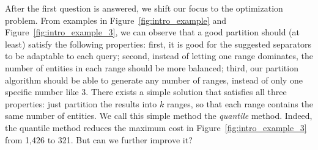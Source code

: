 

After the first question is answered, we shift our focus to the optimization problem. From examples in Figure~\ref{fig:intro_example} and Figure~\ref{fig:intro_example_3}, we can observe that a good partition should (at least) satisfy the following properties: first, it is good for the suggested separators to be adaptable to each query; second, instead of letting one range dominates, the number of entities in each range should be more balanced; third, our partition algorithm should be able to generate any number of ranges, instead of only one specific number like 3. There exists a simple solution that satisfies all three properties: just partition the results into $k$ ranges, so that each range contains the same number of entities. We call this simple method the \emph{quantile} method. Indeed, the quantile method reduces the maximum cost in Figure~\ref{fig:intro_example_3} from 1,426 to 321. But can we further improve it?


